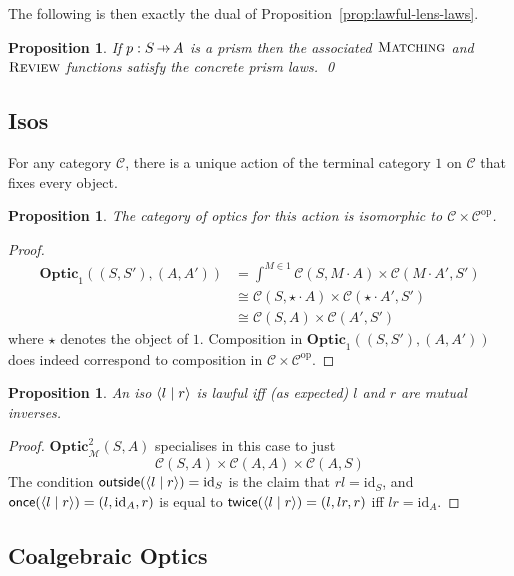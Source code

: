 \documentclass[11pt,letterpaper]{article}
\theoremstyle{plain}
\newtheorem{proposition}[theorem]{Proposition}
\theoremstyle{definition}
\newcommand{\C}{\mathscr{C}}
\newcommand{\M}{\mathscr{M}}
\newcommand{\Optic}{\mathbf{Optic}}
\newcommand{\Twoptic}{\mathbf{Optic}^2}
\newcommand{\id}{\mathrm{id}}
\newcommand{\op}{\mathrm{op}}
\newcommand{\act}{\cdot}
\newcommand{\rep}[2]{{\ensuremath \left\langle #1 \mid #2 \right\rangle}}
\newcommand{\freview}{\textsc{Review}}
\newcommand{\fmatching}{\textsc{Matching}}
\newcommand{\outside}{\mathsf{outside}}
\newcommand{\once}{\mathsf{once}}
\newcommand{\twice}{\mathsf{twice}}
\newcommand{\hto}{\ensuremath{\,\mathaccent\shortmid\rightarrow\,}}
\begin{document}
The following is then exactly the dual of Proposition~\ref{prop:lawful-lens-laws}.
\begin{proposition}\label{prop:lawful-prism-laws}
  If $p : S \hto A$ is a prism then the associated $\fmatching$ and $\freview$ functions satisfy the concrete prism laws. \qed
\end{proposition}

\subsection{Isos}

For any category $\C$, there is a unique action of the terminal category $1$ on $\C$ that fixes every object.

\begin{proposition}
  The category of optics for this action is isomorphic to $\C \times \C^\op$.
\end{proposition}
\begin{proof}
  \begin{align*}
    \Optic_1((S, S'), (A, A')) &= \int^{M \in 1} \C(S, M \act A) \times \C(M \act A', S') \\
                               &\cong \C(S, \star \act A) \times \C(\star \act A', S') \\
                               &\cong \C(S, A) \times \C(A', S')
  \end{align*}
  where $\star$ denotes the object of $1$. Composition in $\Optic_1((S, S'), (A, A'))$ does indeed correspond to composition in $\C \times \C^\op$.
\end{proof}

\begin{proposition}
  An iso $\rep{l}{r}$ is lawful iff (as expected) $l$ and $r$ are mutual inverses.
\end{proposition}
\begin{proof}
$\Twoptic_\M(S, A)$ specialises in this case to just
  \[ \C(S, A) \times \C(A, A) \times \C(A, S) \]
  The condition $\outside(\rep{l}{r}) = \id_S$ is the claim that $rl = \id_S$, and $\once(\rep{l}{r}) = (l, \id_A, r)$ is equal to $\twice(\rep{l}{r}) = (l, lr, r)$ iff $lr = \id_A$.
\end{proof}

\subsection{Coalgebraic Optics}\label{sec:coalgebraic}
\end{document}

